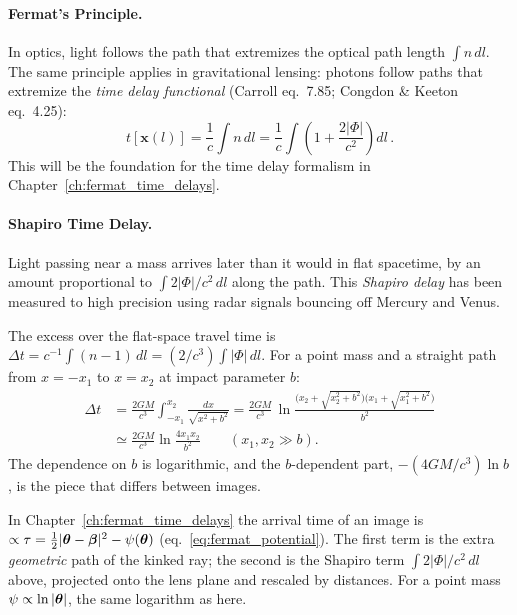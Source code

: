 \paragraph{Fermat's Principle.}
In optics, light follows the path that extremizes the optical path
length $\int n\, dl$.  The same principle applies in gravitational
lensing: photons follow paths that extremize the
\emph{time delay functional} (Carroll eq.~7.85;
Congdon \& Keeton eq.~4.25):
\begin{equation}
    t[\mathbf{x}(l)] = \frac{1}{c} \int n\, dl
    = \frac{1}{c} \int \left(1 + \frac{2|\Phi|}{c^2}\right) dl \,.
    \label{eq:fermat_principle}
\end{equation}
This will be the foundation for the time delay formalism in Chapter~\ref{ch:fermat_time_delays}.

\paragraph{Shapiro Time Delay.}
Light passing near a mass arrives later than it would in flat spacetime,
by an amount proportional to $\int 2|\Phi|/c^2\, dl$ along the path.
This \emph{Shapiro delay} has been measured to high precision using
radar signals bouncing off Mercury and Venus.

\begin{derivation}
The excess over the flat-space travel time is
$\Delta t = c^{-1}\int(n - 1)\,dl = (2/c^3)\int|\Phi|\,dl$.  For a point mass
and a straight path from $x = -x_1$ to $x = x_2$ at impact parameter $b$:
\begin{align*}
\Delta t &= \frac{2GM}{c^3}\int_{-x_1}^{x_2}\frac{dx}{\sqrt{x^2 + b^2}}
= \frac{2GM}{c^3}\,
  \ln\frac{\bigl(x_2 + \sqrt{x_2^2 + b^2}\bigr)\bigl(x_1 + \sqrt{x_1^2 + b^2}\bigr)}{b^2} \\
&\simeq \frac{2GM}{c^3}\ln\frac{4x_1x_2}{b^2}
  \qquad (x_1, x_2 \gg b) .
\end{align*}
The dependence on $b$ is logarithmic, and the $b$-dependent part,
$-(4GM/c^3)\ln b$, is the piece that differs between images.
\end{derivation}

\begin{annotation}
In Chapter~\ref{ch:fermat_time_delays} the arrival time of an image is
$\propto\tau = \tfrac12|\boldsymbol{\theta} - \boldsymbol{\beta}|^2 - \psi(\boldsymbol{\theta})$
(eq.~\eqref{eq:fermat_potential}).  The first term is the extra
\emph{geometric} path of the kinked ray; the second is the Shapiro term
$\int 2|\Phi|/c^2\,dl$ above, projected onto the lens plane and
rescaled by distances.  For a point mass $\psi \propto \ln|\boldsymbol{\theta}|$,
the same logarithm as here.
\end{annotation}

